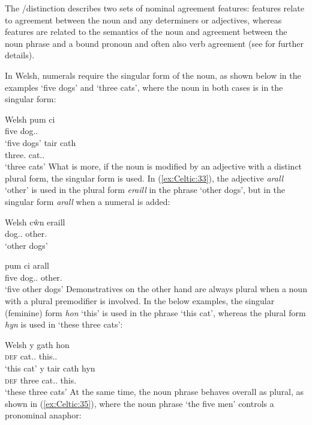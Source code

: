 \documentclass[output=paper,colorlinks,citecolor=brown]{langscibook}
\begin{document}
The \NINDEX/\CONCORD distinction describes two sets of nominal agreement features: \CONCORD features relate to agreement between the noun and any determiners or adjectives, whereas \NINDEX features are related to the semantics of the noun and agreement between the noun phrase and a bound pronoun and often also verb agreement (see  for further details).

In Welsh, numerals require the singular form of the noun, as shown below in the examples `five dogs' and `three cats', where the noun in both cases is in the singular form:

\ea\label{ex:Celtic:32} Welsh \citep[6]{MittSadl05}
\ea
\gll pum ci\\
five dog.\M.{\SG}\\
\glt`five dogs'
\ex
\gll tair  cath\\
three.{\F} cat.\F.{\SG}\\
\glt`three cats'
\z\z
What is more, if the noun is modified by an adjective with a distinct plural form, the singular form is used. In (\ref{ex:Celtic:33}), the adjective \emph{arall} `other' is used in the plural form \emph{eraill} in the phrase `other dogs', but in the singular form \emph{arall} when a numeral is added:

\ea\label{ex:Celtic:33} Welsh \citep[6]{MittSadl05}
\ea
\gll c\^wn  eraill\\
{dog.\M.\PL} other.\PL\\
\glt`other dogs'

\ex
\gll pum ci  arall\\
five {dog.\M.\SG} other.\SG\\
\glt`five other dogs'
\z\z
Demonstratives on the other hand are always plural when a noun with a plural premodifier is involved. In the below examples, the singular (feminine) form \emph{hon} `this' is used in the phrase `this cat', whereas the plural form \emph{hyn} is used in `these three cats':

\ea\label{ex:Celtic:34} Welsh \citep[6]{MittSadl05}
\ea
\gll y gath  hon\\
\textsc{def} {cat.\F.\SG} this.\F.{\SG}\\
\glt`this cat'
\ex
\gll y tair cath  hyn\\
\textsc{def} three {cat.\F.\SG} this.\PL\\
\glt`these three cats'
\z\z
At the same time, the noun phrase behaves overall as plural, as shown in (\ref{ex:Celtic:35}), where the noun phrase `the five men' controls a pronominal anaphor:
\end{document}
